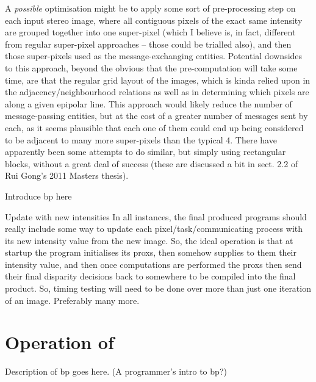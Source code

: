 A \emph{possible} optimisation might be to apply some sort of pre-processing step on each input stereo image, where all contiguous pixels of the exact same intensity are grouped together into one super-pixel (which I believe is, in fact, different from regular super-pixel approaches -- those could be trialled also), and then those super-pixels used as the message-exchanging entities.  Potential downsides to this approach, beyond the obvious that the pre-computation will take some time, are that the regular grid layout of the images, which is kinda relied upon in the adjacency/neighbourhood relations as well as in determining which pixels are along a given epipolar line.  This approach would likely reduce the number of message-passing entities, but at the cost of a greater number of messages sent by each, as it seems plausible that each one of them could end up being considered to be adjacent to many more super-pixels than the typical 4.  There have apparently been some attempts to do similar, but simply using rectangular blocks, without a great deal of success (these are discussed a bit in sect. 2.2 of Rui Gong's 2011 Masters thesis).

Introduce \gls{bp} here

\begin{anfxnote}{Update with new intensities}
In all instances, the final produced programs should really include some way to update each pixel/task/communicating process with its new intensity value from the new image.  So, the ideal operation is that at startup the program initialises its \glspl{prox}, then somehow supplies to them their intensity value, and then once computations are performed the \glspl{prox} then send their final disparity decisions back to somewhere to be compiled into the final product.  So, timing testing will need to be done over more than just one iteration of an image.  Preferably many more.
\end{anfxnote}

\section{Operation of }
Description of \gls{bp} goes here.  (A programmer's intro to \gls{bp}?)

\section{}


